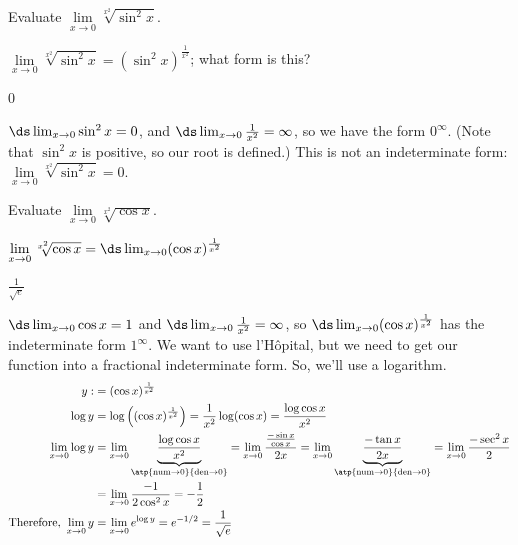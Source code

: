 \begin{Mquestion}
Evaluate $\lim\limits_{x \to 0}\sqrt[x^2]{\sin^2 x}$.
\end{Mquestion}
\begin{hint} $\lim\limits_{x \to 0}\sqrt[x^2]{\sin^2 x}=(\sin^2 x)^{\frac{1}{x^2}}$; what form is this?
\end{hint}
\begin{answer} 0
\end{answer}
\begin{solution} $\ds\lim_{x \to 0} \sin^2 x = 0$, and $\ds\lim_{x \to 0}\frac{1}{x^2}=\infty$, so we have the form $0^\infty$. (Note that $\sin^2 x$ is positive, so our root is defined.) This is not an indeterminate form: $\lim\limits_{x \to 0}\sqrt[x^2]{\sin^2 x}=0$.
\end{solution}


\begin{Mquestion}
Evaluate $\lim\limits_{x \to 0}\sqrt[x^2]{\cos x}$.
\end{Mquestion}
\begin{hint} $\lim\limits_{x \to 0}\sqrt[x^2]{\cos x} = \ds\lim_{x \to 0}(\cos x)^{\frac{1}{x^2}}$
\end{hint}
\begin{answer} $\frac{1}{\sqrt{e}}$
\end{answer}
\begin{solution} $\ds\lim_{x \to 0} \cos x =1$ and $\ds\lim_{x \to 0}\frac{1}{x^2}=\infty$, so $\ds\lim_{x \to 0}(\cos x)^{\frac{1}{x^2}}$ has the indeterminate form $1^\infty$. We want to use l'H\^opital, but we need to get our function into a fractional indeterminate form. So, we'll use a logarithm.
\begin{align*}
y:&=(\cos x)^{\frac{1}{x^2}}\\
\log y &= \log \left((\cos x)^{\frac{1}{x^2}}\right)=\frac{1}{x^2}\log(\cos x)=\frac{\log \cos x}{x^2}\\
\lim_{x \to 0}\log y &=\lim_{x \to 0}\underbrace{\frac{\log \cos x}{x^2}}_{\atp
	{\mathrm{num}\to0}
	{\mathrm{den}\to 0}}
	=
	\lim_{x \to 0} \frac{\frac{-\sin x}{\cos x}}{2x}=
	\lim_{x \to 0} \underbrace{\frac{-\tan x}{2x}}_{\atp
	{\mathrm{num}\to0}
	{\mathrm{den}\to 0}}
	=
	\lim_{x \to 0}\frac{-\sec^2x}{2}\\
	&=\lim_{x \to 0}\frac{-1}{2\cos^2 x}=-\frac{1}{2}\\
\mbox{Therefore, } \lim_{x \to 0} y &=\lim_{x \to 0}e^{\log y}=e^{-1/2}=\frac{1}{\sqrt{e}}
\end{align*}
\end{solution}


